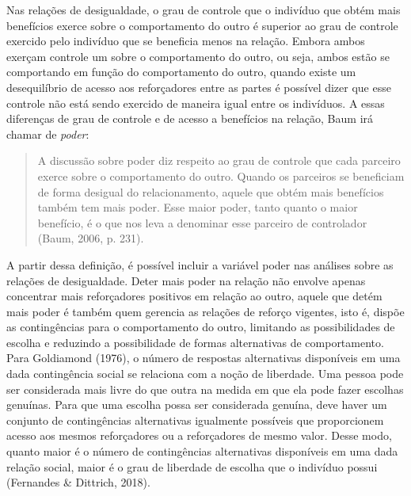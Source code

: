 Nas relações de desigualdade, o grau de controle que o indivíduo que obtém mais benefícios exerce sobre o comportamento do outro é superior ao grau de controle exercido pelo indivíduo que se beneficia menos na relação. Embora ambos exerçam controle um sobre o comportamento do outro, ou seja, ambos estão se comportando em função do comportamento do outro, quando existe um desequilíbrio de acesso aos reforçadores entre as partes é possível dizer que esse controle não está sendo exercido de maneira igual entre os indivíduos. A essas diferenças de grau de controle e de acesso a benefícios na relação, Baum irá chamar de \textit{poder}:

\begin{quote}
    A discussão sobre poder diz respeito ao grau de controle que cada parceiro exerce sobre o comportamento do outro. Quando os parceiros se beneficiam de forma desigual do relacionamento, aquele que obtém mais benefícios também tem mais poder. Esse maior poder, tanto quanto o maior benefício, é o que nos leva a denominar esse parceiro de controlador (Baum, 2006, p. 231). 
\end{quote}

A partir dessa definição, é possível incluir a variável poder nas análises sobre as relações de desigualdade. Deter mais poder na relação não envolve apenas concentrar mais reforçadores positivos em relação ao outro, aquele que detém mais poder é também quem gerencia as relações de reforço vigentes, isto é, dispõe as contingências para o comportamento do outro, limitando as possibilidades de escolha e reduzindo a possibilidade de formas alternativas de comportamento. Para Goldiamond (1976), o número de respostas alternativas disponíveis em uma dada contingência social se relaciona com a noção de liberdade. Uma pessoa pode ser considerada mais livre do que outra na medida em que ela pode fazer escolhas genuínas. Para que uma escolha possa ser considerada genuína, deve haver um conjunto de contingências alternativas igualmente possíveis que proporcionem acesso aos mesmos reforçadores ou a reforçadores de mesmo valor. Desse modo, quanto maior é o número de contingências alternativas disponíveis em uma dada relação social, maior é o grau de liberdade de escolha que o indivíduo possui (Fernandes \& Dittrich, 2018).

